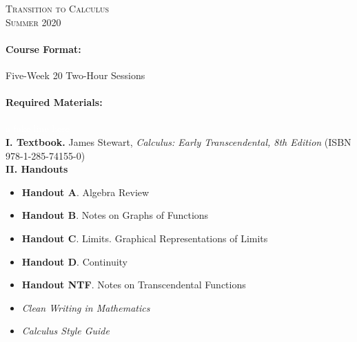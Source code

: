 \documentclass[11pt]{exam}
\newcommand{\afakeline}{\textcolor{white}{a fake line here}}
\begin{document}
\begin{center}
{\large 
\textsc{%
Transition to Calculus}}\\
\textsc{Summer 2020}\\[1em]
\end{center}

\smallskip

\paragraph{Course Format:} Five-Week 20 Two-Hour Sessions

\paragraph{Required Materials:}\afakeline\\[0.5em]
\textbf{I. Textbook.} James Stewart, \textit{Calculus: Early Transcendental, 8th Edition} (ISBN 978-1-285-74155-0) \\[0.5em]
\textbf{II. Handouts} 
\begin{itemize}
    \item{\bf Handout A}. Algebra Review
    \item{\bf Handout B}. Notes on Graphs of Functions
    \item{\bf Handout C}. Limits. Graphical Representations of Limits
    \item{\bf Handout D}. Continuity
    \item{\bf Handout NTF}. Notes on Transcendental Functions
    \item {\em Clean Writing in Mathematics}
    \item {\em Calculus Style Guide}
\end{itemize}
\end{document}
